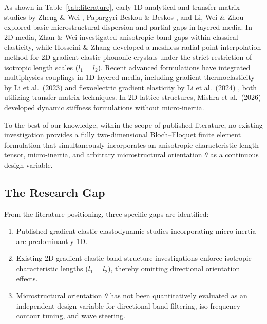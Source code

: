 As shown in Table~\ref{tab:literature}, early 1D analytical and transfer-matrix studies by Zheng \& Wei \cite{zhengwei2009}, Papargyri-Beskou \& Beskos \cite{papargyribeskou2009}, and Li, Wei \& Zhou \cite{liweizhou2016} explored basic microstructural dispersion and partial gaps in layered media. In 2D media, Zhan \& Wei \cite{zhanwei2010} investigated anisotropic band gaps within classical elasticity, while Hosseini \& Zhang \cite{hosseinizhang2021} developed a meshless radial point interpolation method for 2D gradient-elastic phononic crystals under the strict restriction of isotropic length scales ($l_1 = l_2$). Recent advanced formulations have integrated multiphysics couplings in 1D layered media, including gradient thermoelasticity by Li et al.\ (2023) \cite{li2023anchorA} and flexoelectric gradient elasticity by Li et al.\ (2024) \cite{li2024anchorB}, both utilizing transfer-matrix techniques. In 2D lattice structures, Mishra et al.\ (2026) \cite{mishra2026anchorC} developed dynamic stiffness formulations without micro-inertia. 

To the best of our knowledge, within the scope of published literature, no existing investigation provides a fully two-dimensional Bloch--Floquet finite element formulation that simultaneously incorporates an anisotropic characteristic length tensor, micro-inertia, and arbitrary microstructural orientation $\theta$ as a continuous design variable.

\subsection{The Research Gap}
From the literature positioning, three specific gaps are identified:
\begin{enumerate}[label=(\alph*)]
  \item Published gradient-elastic elastodynamic studies incorporating micro-inertia are predominantly 1D.
  \item Existing 2D gradient-elastic band structure investigations enforce isotropic characteristic lengths ($l_1 = l_2$), thereby omitting directional orientation effects.
  \item Microstructural orientation $\theta$ has not been quantitatively evaluated as an independent design variable for directional band filtering, iso-frequency contour tuning, and wave steering.
\end{enumerate}


